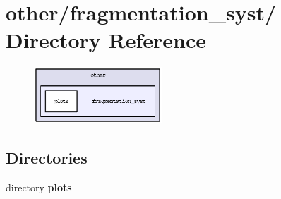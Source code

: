 \section{other/fragmentation\_\-syst/ Directory Reference}
\label{dir_0aaf0a5bf874cd7af82f37d1241f6804}


\begin{figure}[H]
\begin{center}
\leavevmode
\includegraphics[width=136pt]{dir_0aaf0a5bf874cd7af82f37d1241f6804_dep}
\end{center}
\end{figure}
\subsection*{Directories}
\begin{CompactItemize}
\item 
directory \bf{plots}
\end{CompactItemize}
